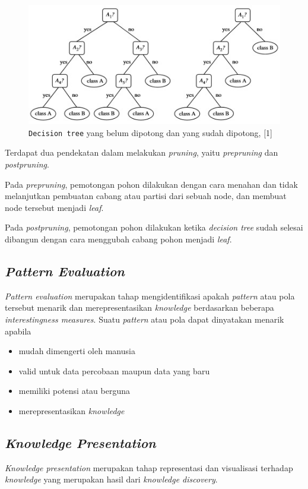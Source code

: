 \begin{figure}
\includegraphics[scale=1]{Gambar/treepruning.jpg}
\caption[\texttt{Decision Tree Pruned}]{\texttt{Decision tree} yang belum dipotong dan yang sudah dipotong, [1]} 
\end{figure}

Terdapat dua pendekatan dalam melakukan \textsl{pruning}, yaitu \textsl{prepruning} dan \textsl{postpruning}.

Pada \textsl{prepruning}, pemotongan pohon dilakukan dengan cara menahan dan tidak melanjutkan pembuatan cabang atau partisi dari sebuah node, dan membuat node tersebut menjadi \textsl{leaf}. 

Pada \textsl{postpruning}, pemotongan pohon dilakukan ketika \textsl{decision tree} sudah selesai dibangun dengan cara menggubah cabang pohon menjadi \textsl{leaf}.

\subsection{\textsl{Pattern Evaluation}}
\textsl{Pattern evaluation} merupakan tahap mengidentifikasi apakah \textsl{pattern} atau pola tersebut menarik dan merepresentasikan \textsl{knowledge} berdasarkan beberapa \textsl{interestingness measures}.
Suatu \textsl{pattern} atau pola dapat dinyatakan menarik apabila
\begin{itemize}
	\item mudah dimengerti oleh manusia
	\item valid untuk data percobaan maupun data yang baru
	\item memiliki potensi atau berguna
	\item merepresentasikan \textsl{knowledge}
\end{itemize}

\subsection{\textsl{Knowledge Presentation}}
\textsl{Knowledge presentation} merupakan tahap representasi dan visualisasi terhadap \textsl{knowledge} yang merupakan hasil dari \textsl{knowledge discovery}.	

